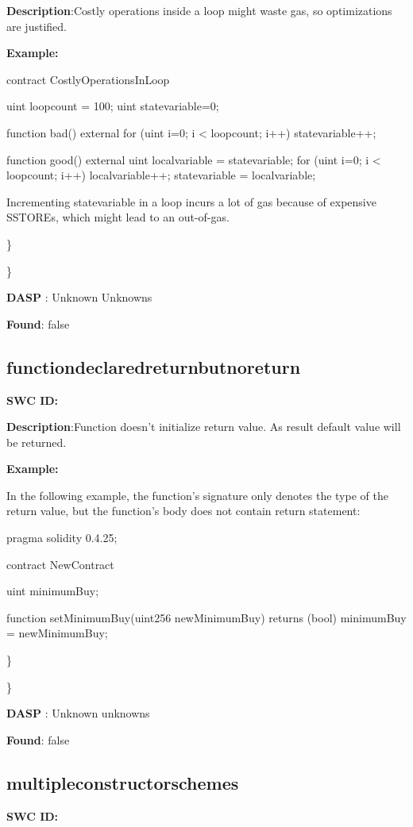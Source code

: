 \documentclass{article}
\begin{document}
{\textbf{Description}:Costly operations inside a loop might waste gas, so optimizations are justified.


\textbf{Example:} 

contract CostlyOperationsInLoop{

    uint loop\textunderscore count = 100;
    uint state\textunderscore variable=0;

    function bad() external{
        for (uint i=0; i < loop\textunderscore count; i++){
            state\textunderscore variable++;
        }
    }

    function good() external{
      uint local\textunderscore variable = state\textunderscore variable;
      for (uint i=0; i < loop\textunderscore count; i++){
        local\textunderscore variable++;
      }
      state\textunderscore variable = local\textunderscore variable;
    }
}
Incrementing state\textunderscore variable in a loop incurs a lot of gas because of expensive SSTOREs, which might lead to an out-of-gas.

\} 

\} 

\textbf{DASP} : Unknown Unknowns

\textbf{Found}: false

\subsection{function\textunderscore declared\textunderscore return\textunderscore but\textunderscore no\textunderscore return} 
\textbf{SWC \textunderscore ID:} 

\textbf{Description}:Function doesn't initialize return value. As result default value will be returned.


\textbf{Example:} 

In the following example, the function's signature only denotes the type of the return value, but the function's body does not contain return statement:

pragma solidity 0.4.25;

contract NewContract {
    uint minimumBuy;

    function setMinimumBuy(uint256 newMinimumBuy) returns (bool){
        minimumBuy = newMinimumBuy;
    }
}

\} 

\} 

\textbf{DASP} : Unknown unknowns

\textbf{Found}: false

\subsection{multiple\textunderscore constructor\textunderscore schemes} 
\textbf{SWC \textunderscore ID:} 

}
\end{document}
